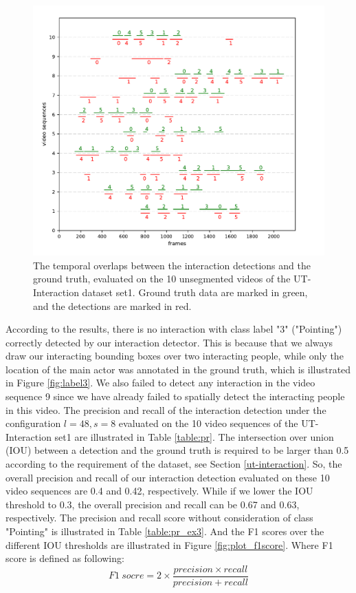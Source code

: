 \begin{figure}
	\includegraphics[trim=0.8cm 0cm 5cm 0cm]{fig01/plot_temp.pdf}
	\caption{The temporal overlaps between the interaction detections and the ground truth, evaluated on the 10 unsegmented videos of the UT-Interaction dataset set1. Ground truth data are marked in green, and the detections are marked in red.}
	\label{fig:plot_temp}
\end{figure}
\par

According to the results, there is no interaction with class label 
"3" ("Pointing") correctly detected by our interaction detector. This is because that we always draw our interacting bounding boxes over two interacting people, while only the location of the main actor was annotated in the ground truth, which is illustrated in Figure \ref{fig:label3}. We also failed to detect any interaction in the video sequence 9 since we have already failed to spatially detect the interacting people in this video. The precision and recall of the interaction detection under the configuration \(l = 48, s = 8\) evaluated on the 10 video sequences of the UT-Interaction set1 are illustrated in Table \ref{table:pr}. The intersection over union (IOU) between a detection and the ground truth is required to be larger than 0.5 according to the requirement of the dataset, see Section \ref{ut-interaction}. So, the overall precision and recall of our interaction detection evaluated on these 10 video sequences are 0.4 and 0.42, respectively. While if we lower the IOU threshold to 0.3, the overall precision and recall can be 0.67 and 0.63, respectively. The precision and recall score without consideration of class "Pointing" is illustrated in Table \ref{table:pr_ex3}. And the F1 scores over the different IOU thresholds are illustrated in Figure \ref{fig:plot_f1score}. Where F1 score is defined as following:
\begin{equation}
	F1\ socre = 2 \times \frac{precision \times recall}{precision + recall}
\end{equation}

